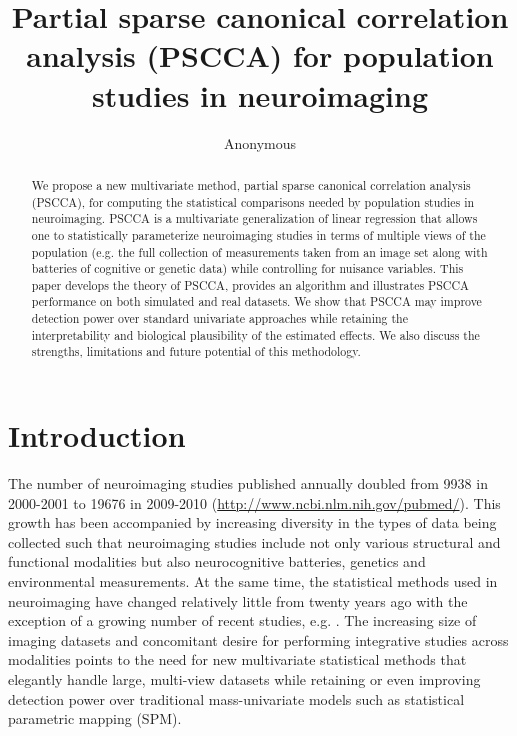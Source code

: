 \documentclass{llncs}
\begin{document}
\vspace{-0.1in}
\title{Partial sparse canonical correlation analysis (PSCCA) for population
  studies in neuroimaging}
\author{Anonymous}
\maketitle              
\begin{abstract}
We propose a new multivariate method, partial sparse canonical
correlation analysis (PSCCA), for computing the statistical
comparisons needed by population studies in neuroimaging.  PSCCA is a
multivariate generalization of linear regression that allows one to statistically parameterize neuroimaging studies in terms of
multiple views of the population (e.g. the full collection of
measurements taken from an image set along with batteries of cognitive
or genetic data) while controlling for nuisance variables.  This paper
develops the theory of PSCCA, provides an algorithm and illustrates
PSCCA performance on both simulated and real datasets.  We show that
PSCCA may improve detection power over standard univariate approaches
while retaining the interpretability and biological plausibility of
the estimated effects.  We also discuss the strengths, limitations and
future potential of this methodology.
\end{abstract}
\section{Introduction}
The number of neuroimaging studies published annually doubled from
9938 in 2000-2001 to 19676 in 2009-2010
(\url{http://www.ncbi.nlm.nih.gov/pubmed/}).  This growth has been
accompanied by increasing diversity in the types of data being
collected such that neuroimaging studies include not only various
structural and functional modalities but also neurocognitive
batteries, genetics and environmental measurements.  At the same time,
the statistical methods used in neuroimaging have changed relatively
little from twenty years ago with the exception of a growing number of
recent studies, e.g. \cite{Tosun2010a}.  The increasing size of imaging
datasets and concomitant desire for performing integrative studies
across modalities points to the need for new multivariate statistical
methods that elegantly handle large, multi-view datasets while
retaining or even improving detection power over traditional
mass-univariate models such as statistical parametric mapping (SPM).
\end{document}
